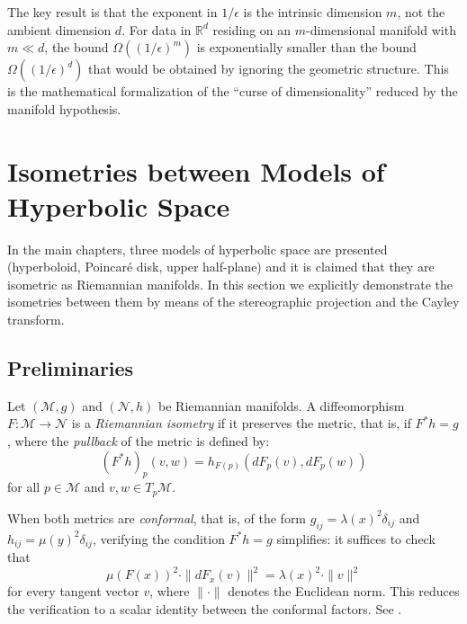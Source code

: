 \begin{remark}\label{rem:complejidad_intrinseca}
The key result is that the exponent in $1/\epsilon$ is the intrinsic dimension $m$, not the ambient dimension $d$. For data in $\mathbb{R}^d$ residing on an $m$-dimensional manifold with $m \ll d$, the bound $\Omega((1/\epsilon)^m)$ is exponentially smaller than the bound $\Omega((1/\epsilon)^d)$ that would be obtained by ignoring the geometric structure. This is the mathematical formalization of the ``curse of dimensionality'' reduced by the manifold hypothesis.
\end{remark}

\section{Isometries between Models of Hyperbolic Space}\label{sec:isometrias_hiperbolico}

In the main chapters, three models of hyperbolic space are presented (hyperboloid, Poincaré disk, upper half-plane) and it is claimed that they are isometric as Riemannian manifolds. In this section we explicitly demonstrate the isometries between them by means of the stereographic projection and the Cayley transform.

\subsection{Preliminaries}\label{subsec:isometrias_preliminares}

\begin{definition}\label{def:isometria_riemanniana}
Let $(\mathcal{M}, g)$ and $(\mathcal{N}, h)$ be Riemannian manifolds. A diffeomorphism $F: \mathcal{M} \to \mathcal{N}$ is a \textit{Riemannian isometry} if it preserves the metric, that is, if $F^*h = g$, where the \textit{pullback} of the metric is defined by:
\begin{equation}\label{eq:pullback_metrica}
(F^*h)_p(v, w) = h_{F(p)}(dF_p(v), dF_p(w))
\end{equation}
for all $p \in \mathcal{M}$ and $v, w \in T_p\mathcal{M}$.
\end{definition}

\begin{remark}\label{rem:isometria_conforme}
When both metrics are \textit{conformal}, that is, of the form $g_{ij} = \lambda(x)^2 \delta_{ij}$ and $h_{ij} = \mu(y)^2 \delta_{ij}$, verifying the condition $F^*h = g$ simplifies: it suffices to check that
\[
\mu(F(x))^2 \cdot \|dF_x(v)\|^2 = \lambda(x)^2 \cdot \|v\|^2
\]
for every tangent vector $v$, where $\|\cdot\|$ denotes the Euclidean norm. This reduces the verification to a scalar identity between the conformal factors. See \citet[Chapter~3]{lee2018introduction}.
\end{remark}

